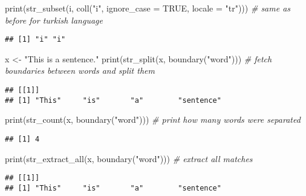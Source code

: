 \documentclass[
]{article}
\newenvironment{Shaded}{\begin{snugshade}}{\end{snugshade}}
\newcommand{\AttributeTok}[1]{\textcolor[rgb]{0.77,0.63,0.00}{#1}}
\newcommand{\CommentTok}[1]{\textcolor[rgb]{0.56,0.35,0.01}{\textit{#1}}}
\newcommand{\ConstantTok}[1]{\textcolor[rgb]{0.00,0.00,0.00}{#1}}
\newcommand{\FunctionTok}[1]{\textcolor[rgb]{0.00,0.00,0.00}{#1}}
\newcommand{\NormalTok}[1]{#1}
\newcommand{\OtherTok}[1]{\textcolor[rgb]{0.56,0.35,0.01}{#1}}
\newcommand{\StringTok}[1]{\textcolor[rgb]{0.31,0.60,0.02}{#1}}
\begin{document}
\begin{Shaded}
\begin{Highlighting}[]
\FunctionTok{print}\NormalTok{(}\FunctionTok{str\_subset}\NormalTok{(i, }\FunctionTok{coll}\NormalTok{(}\StringTok{"i"}\NormalTok{, }\AttributeTok{ignore\_case =} \ConstantTok{TRUE}\NormalTok{, }\AttributeTok{locale =} \StringTok{"tr"}\NormalTok{))) }\CommentTok{\# same as before for turkish language}
\end{Highlighting}
\end{Shaded}

\begin{verbatim}
## [1] "i" "i"
\end{verbatim}

\begin{Shaded}
\begin{Highlighting}[]
\NormalTok{x }\OtherTok{\textless{}{-}} \StringTok{"This is a sentence."}
\FunctionTok{print}\NormalTok{(}\FunctionTok{str\_split}\NormalTok{(x, }\FunctionTok{boundary}\NormalTok{(}\StringTok{"word"}\NormalTok{))) }\CommentTok{\# fetch boundaries between words and split them}
\end{Highlighting}
\end{Shaded}

\begin{verbatim}
## [[1]]
## [1] "This"     "is"       "a"        "sentence"
\end{verbatim}

\begin{Shaded}
\begin{Highlighting}[]
\FunctionTok{print}\NormalTok{(}\FunctionTok{str\_count}\NormalTok{(x, }\FunctionTok{boundary}\NormalTok{(}\StringTok{"word"}\NormalTok{))) }\CommentTok{\# print how many words were separated}
\end{Highlighting}
\end{Shaded}

\begin{verbatim}
## [1] 4
\end{verbatim}

\begin{Shaded}
\begin{Highlighting}[]
\FunctionTok{print}\NormalTok{(}\FunctionTok{str\_extract\_all}\NormalTok{(x, }\FunctionTok{boundary}\NormalTok{(}\StringTok{"word"}\NormalTok{))) }\CommentTok{\# extract all matches}
\end{Highlighting}
\end{Shaded}

\begin{verbatim}
## [[1]]
## [1] "This"     "is"       "a"        "sentence"
\end{verbatim}
\end{document}
